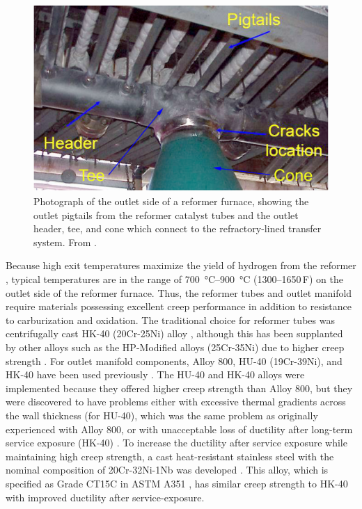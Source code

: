 \begin{figure}[h]
\centering
\includegraphics{figures/reformer-tee-cone}
\caption{Photograph of the outlet side of a reformer furnace, showing the outlet pigtails from the reformer catalyst tubes and the outlet header, tee, and cone which connect to the refractory-lined transfer system.  From \citet{penso_repair_2006}.}
\label{fig:reformer-tee-cone}
\end{figure}

Because high exit temperatures maximize the yield of hydrogen from the reformer \cite{haussinger_hydrogen_2000}, typical temperatures are in the range of \SIrange[range-phrase=--]{700}{900}{\degreeCelsius} (\numrange[range-phrase=--]{1300}{1650}\,\textdegree{}F) on the outlet side of the reformer furnace. Thus, the reformer tubes and outlet manifold require materials possessing excellent creep performance in addition to resistance to carburization and oxidation. The traditional choice for reformer tubes was centrifugally cast HK-40 (20Cr-25Ni) alloy \cite{rostrup-nielsen_catalytic_1984}, although this has been supplanted by other alloys such as the HP-Modified alloys (25Cr-35Ni) due to higher creep strength \cite{schillmoller_hp-modified_1992}. For outlet manifold components, Alloy 800, HU-40 (19Cr-39Ni), and HK-40 have been used previously \cite{shibasaki_experience_1994}. The HU-40 and HK-40 alloys were implemented because they offered higher creep strength than Alloy 800, but they were discovered to have problems either with excessive thermal gradients across the wall thickness (for HU-40), which was the same problem as originally experienced with Alloy 800, or with unacceptable loss of ductility after long-term service exposure (HK-40) \cite{shibasaki_experience_1994,collins_effect_1980}. To increase the ductility after service exposure while maintaining high creep strength, a cast heat-resistant stainless steel with the nominal composition of 20Cr-32Ni-1Nb was developed \cite{collins_effect_1980}. This alloy, which is specified as Grade CT15C in ASTM A351 \cite{astm_a351_2010}, has similar creep strength to HK-40 \cite{shibasaki_experience_1994} with improved ductility after service-exposure. 

